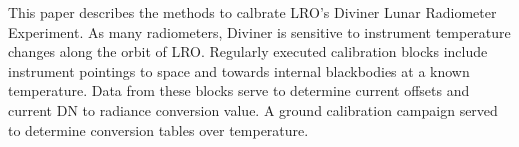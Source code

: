 This paper describes the methods to calbrate LRO's Diviner Lunar Radiometer Experiment. As many radiometers, Diviner is sensitive to instrument temperature changes along the orbit of LRO. Regularly executed calibration blocks include instrument pointings to space and towards internal blackbodies at a known temperature. Data from these blocks serve to determine current offsets and current DN to radiance conversion value. A ground calibration campaign served to determine conversion tables over temperature.